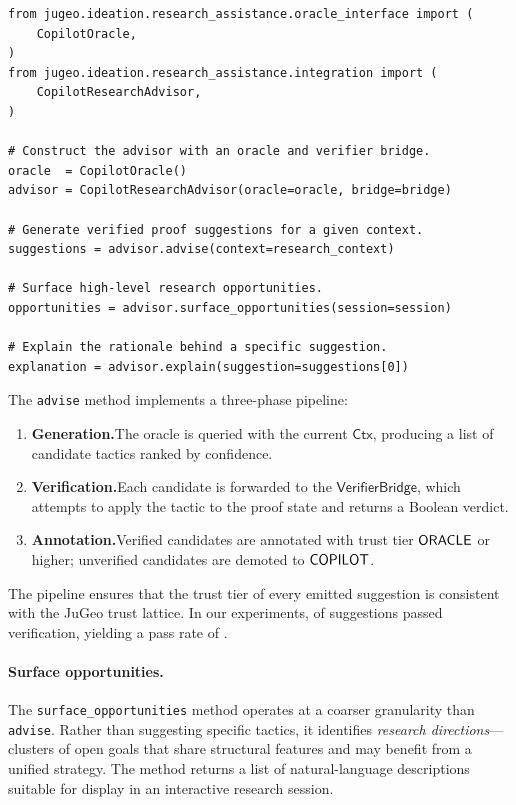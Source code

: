 \documentclass[11pt]{article}
\newcommand{\Context}{\mathsf{Ctx}}
\begin{document}
\begin{lstlisting}[style=jugeo-python,caption={CopilotResearchAdvisor core interface.},label={lst:research-advisor}]
from jugeo.ideation.research_assistance.oracle_interface import (
    CopilotOracle,
)
from jugeo.ideation.research_assistance.integration import (
    CopilotResearchAdvisor,
)

# Construct the advisor with an oracle and verifier bridge.
oracle  = CopilotOracle()
advisor = CopilotResearchAdvisor(oracle=oracle, bridge=bridge)

# Generate verified proof suggestions for a given context.
suggestions = advisor.advise(context=research_context)

# Surface high-level research opportunities.
opportunities = advisor.surface_opportunities(session=session)

# Explain the rationale behind a specific suggestion.
explanation = advisor.explain(suggestion=suggestions[0])
\end{lstlisting}

The \texttt{advise} method implements a three-phase pipeline:

\begin{enumerate}
  \item \textbf{Generation.}\quad The oracle is queried with the
        current $\Context$, producing a list of candidate tactics
        ranked by confidence.
  \item \textbf{Verification.}\quad Each candidate is forwarded to
        the $\mathsf{VerifierBridge}$, which attempts to apply the
        tactic to the proof state and returns a Boolean verdict.
  \item \textbf{Annotation.}\quad Verified candidates are annotated
        with trust tier $\mathsf{ORACLE}$ or higher; unverified candidates
        are demoted to $\mathsf{COPILOT}$.
\end{enumerate}

The pipeline ensures that the trust tier of every emitted
suggestion is consistent with the JuGeo trust lattice.  In our
experiments, \ppXCIsoundSuggestions{} of \ppXCIsuggestionsGenerated{}
suggestions passed verification, yielding a pass rate of
\ppXCIverificationPassRate{}.

\paragraph{Surface opportunities.}
The \texttt{surface\_opportunities} method operates at a coarser
granularity than \texttt{advise}.  Rather than suggesting specific
tactics, it identifies \emph{research directions}—clusters of open
goals that share structural features and may benefit from a
unified strategy.  The method returns a list of natural-language
descriptions suitable for display in an interactive research
session.
\end{document}
